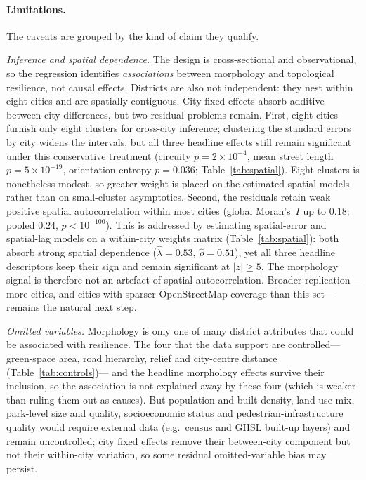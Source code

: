 \paragraph{Limitations.} The caveats are grouped by the kind of claim they qualify.

\emph{Inference and spatial dependence.} The design is cross-sectional and
observational, so the regression identifies \emph{associations} between morphology
and topological resilience, not causal effects. Districts are also not independent:
they nest within eight cities and are spatially contiguous. City fixed effects
absorb additive between-city differences, but two residual problems remain. First,
eight cities furnish only eight clusters for cross-city inference; clustering the
standard errors by city widens the intervals, but all three headline effects still
remain significant under this conservative treatment (circuity $p=2\times10^{-4}$,
mean street length $p=5\times10^{-19}$, orientation entropy $p=0.036$;
Table~\ref{tab:spatial}). Eight clusters is nonetheless modest, so greater weight is placed on the
estimated spatial models rather than on small-cluster asymptotics. Second, the
residuals retain weak positive spatial autocorrelation within most cities (global
Moran's~$I$ up to $0.18$; pooled $0.24$, $p<10^{-100}$). This is addressed by
estimating spatial-error and spatial-lag models on a within-city weights matrix
(Table~\ref{tab:spatial}): both absorb strong spatial dependence
($\hat\lambda=0.53$, $\hat\rho=0.51$), yet all three headline descriptors keep their
sign and remain significant at $|z|\ge5$. The morphology signal is therefore not an
artefact of spatial autocorrelation. Broader replication---more cities, and cities
with sparser OpenStreetMap coverage than this set---remains the natural next step.

\emph{Omitted variables.} Morphology is only one of many district attributes that
could be associated with resilience. The four that the data
support are controlled---green-space
area, road hierarchy, relief and city-centre distance (Table~\ref{tab:controls})---
and the headline morphology effects survive their inclusion, so the association is
not explained away by these four (which is weaker than ruling them out as causes).
But population and built density, land-use mix, park-level size
and quality, socioeconomic status and pedestrian-infrastructure quality would
require external data (e.g.\ census and GHSL built-up layers) and remain
uncontrolled; city fixed effects remove their between-city component but not their
within-city variation, so some residual omitted-variable bias may persist.

